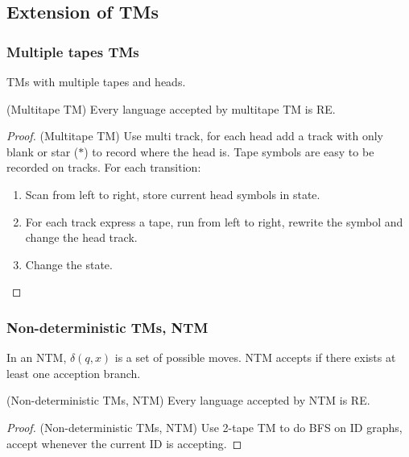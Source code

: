 
\usepackage{../../lectures_preamble}


    \subsection{Extension of TMs}
        \subsubsection{Multiple tapes TMs}
        TMs with multiple tapes and heads.
        \begin{theorem}
            (Multitape TM) Every language accepted by multitape TM is RE.
        \end{theorem}
        \begin{proof}
            (Multitape TM) Use multi track, for each head add a track with only blank or star ($*$) to record where the head is. Tape symbols are easy to be recorded on tracks. For each transition:
            \begin{enumerate}
                \item Scan from left to right, store current head symbols in state.
                \item For each track express a tape, run from left to right, rewrite the symbol and change the head track.
                \item Change the state.
            \end{enumerate}
        \end{proof}
        \subsubsection{Non-deterministic TMs, NTM}
        In an NTM, $\delta\left( q,x \right) $ is a set of possible moves. NTM accepts if there exists at least one acception branch.
        \begin{theorem}
            (Non-deterministic TMs, NTM) Every language accepted by NTM is RE.
        \end{theorem}
        \begin{proof}
            (Non-deterministic TMs, NTM) Use 2-tape TM to do BFS on ID graphs, accept whenever the current ID is accepting.
        \end{proof}
